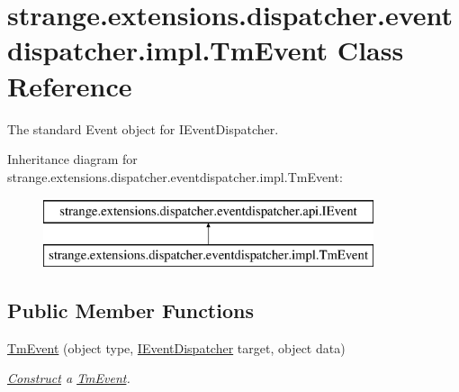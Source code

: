 \hypertarget{classstrange_1_1extensions_1_1dispatcher_1_1eventdispatcher_1_1impl_1_1_tm_event}{\section{strange.\-extensions.\-dispatcher.\-eventdispatcher.\-impl.\-Tm\-Event Class Reference}
\label{classstrange_1_1extensions_1_1dispatcher_1_1eventdispatcher_1_1impl_1_1_tm_event}
}


The standard Event object for I\-Event\-Dispatcher.  


Inheritance diagram for strange.\-extensions.\-dispatcher.\-eventdispatcher.\-impl.\-Tm\-Event\-:\begin{figure}[H]
\begin{center}
\leavevmode
\includegraphics[height=2.000000cm]{classstrange_1_1extensions_1_1dispatcher_1_1eventdispatcher_1_1impl_1_1_tm_event}
\end{center}
\end{figure}
\subsection*{Public Member Functions}
\begin{DoxyCompactItemize}
\item 
\hypertarget{classstrange_1_1extensions_1_1dispatcher_1_1eventdispatcher_1_1impl_1_1_tm_event_a606af8e7c4e19a2c4223e493e3b35987}{\hyperlink{classstrange_1_1extensions_1_1dispatcher_1_1eventdispatcher_1_1impl_1_1_tm_event_a606af8e7c4e19a2c4223e493e3b35987}{Tm\-Event} (object type, \hyperlink{interfacestrange_1_1extensions_1_1dispatcher_1_1eventdispatcher_1_1api_1_1_i_event_dispatcher}{I\-Event\-Dispatcher} target, object data)}\label{classstrange_1_1extensions_1_1dispatcher_1_1eventdispatcher_1_1impl_1_1_tm_event_a606af8e7c4e19a2c4223e493e3b35987}

\begin{DoxyCompactList}\small\item\em \hyperlink{class_construct}{Construct} a \hyperlink{classstrange_1_1extensions_1_1dispatcher_1_1eventdispatcher_1_1impl_1_1_tm_event}{Tm\-Event}. \end{DoxyCompactList}\end{DoxyCompactItemize}
